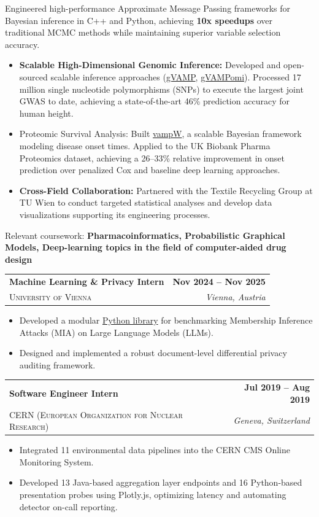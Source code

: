 \documentclass[a4paper,11pt]{article}
\makeatletter
\newcommand{\roleheader}[4]{
    \noindent
    \begin{tabularx}{\linewidth}{@{} X r @{}}
        {\Large \textbf{\textcolor{primary}{#1}}} & {\normalsize \textbf{#2}} \\
        {\normalsize \textsc{#3}} & {\normalsize \textit{#4}}
    \end{tabularx}
    \vspace{2pt}
}
\makeatother
\begin{document}
\noindent Engineered high-performance Approximate Message Passing frameworks for Bayesian inference in C++ and Python, achieving \textbf{10x speedups} over traditional MCMC methods while maintaining superior variable selection accuracy.
\begin{itemize}[nosep, leftmargin=1.5em, itemsep=3pt, topsep=0pt]
    \item[--] \textbf{Scalable High-Dimensional Genomic Inference:} Developed and open-sourced scalable inference approaches (\href{https://github.com/medical-genomics-group/gVAMP}{gVAMP}, \href{https://github.com/Information-and-learning-for-genomics/Time2EVAMP}{gVAMPomi}). Processed 17 million single nucleotide polymorphisms (SNPs) to execute the largest joint GWAS to date, achieving a state-of-the-art 46\% prediction accuracy for human height.
    \item[--] Proteomic Survival Analysis: Built \href{https://github.com/Information-and-learning-for-genomics/Time2EVAMP}{vampW}, a scalable Bayesian framework modeling disease onset times. Applied to the UK Biobank Pharma Proteomics dataset, achieving a 26--33\% relative improvement in onset prediction over penalized Cox and baseline deep learning approaches.
    \item[--] \textbf{Cross-Field Collaboration:} Partnered with the Textile Recycling Group at TU Wien to conduct targeted statistical analyses and develop data visualizations supporting its engineering processes.
\end{itemize}

Relevant coursework: \textbf{Pharmacoinformatics, Probabilistic Graphical Models, Deep-learning topics in the field of computer-aided drug design}
\vspace{8pt}

\newpage
\roleheader{Machine Learning \& Privacy Intern}{Nov 2024 -- Nov 2025}{University of Vienna}{Vienna, Austria}
\begin{itemize}[nosep, leftmargin=1.5em, itemsep=2pt, topsep=2pt]
    \item[--] Developed a modular \href{https://github.com/ADepope/modular-Lan-MIA}{Python library} for benchmarking Membership Inference Attacks (MIA) on Large Language Models (LLMs).
    \item[--] Designed and implemented a robust document-level differential privacy auditing framework.
\end{itemize}
\vspace{8pt}

\roleheader{Software Engineer Intern}{Jul 2019 -- Aug 2019}{CERN (European Organization for Nuclear Research)}{Geneva, Switzerland}
\begin{itemize}[nosep, leftmargin=1.5em, itemsep=2pt, topsep=3pt]
    \item[--] Integrated 11 environmental data pipelines into the CERN CMS Online Monitoring System.
    \item[--] Developed 13 Java-based aggregation layer endpoints and 16 Python-based presentation probes using Plotly.js, optimizing latency and automating detector on-call reporting.
\end{itemize}
\end{document}

